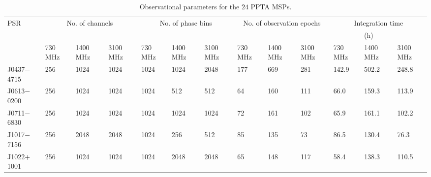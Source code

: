 \documentclass[useAMS,usenatbib]{mn2e}
\begin{document}
\begin{table}
\caption{Observational parameters for the $24$ PPTA MSPs.}
\label{obs}
\begin{center}
\begin{tabular}{p{1.5cm}p{0.9cm}<{\centering}p{0.9cm}<{\centering}p{0.9cm}<{\centering}p{0.9cm}<{\centering}p{0.9cm}<{\centering}p{0.9cm}<{\centering}p{0.9cm}<{\centering}p{0.9cm}<{\centering}p{0.9cm}<{\centering}p{0.9cm}<{\centering}p{0.9cm}<{\centering}p{0.9cm}<{\centering}}
\hline
PSR         &     \multicolumn{3}{c}{No. of channels}   &   \multicolumn{3}{c}{No. of phase bins}  &    \multicolumn{3}{c}{No. of observation epochs}   &    \multicolumn{3}{c}{Integration time}      \\
            &         &                 &          &         &             &          &         &             &          &         &   (h)            &       \\
            & 730 MHz &    1400 MHz     & 3100 MHz & 730 MHz &  1400 MHz   & 3100 MHz & 730 MHz &  1400 MHz   & 3100 MHz & 730 MHz &  1400 MHz        & 3100 MHz    \\
\hline
J0437$-$4715&  256    &    1024         &   1024   &  1024   &  1024       &  2048    &  177    &  669        & 281      &  142.9  &    502.2         &  248.8   \\
J0613$-$0200&  256    &    1024         &   1024   &  1024   &  512        &  512     &  64     &  160        & 111      &  66.0   &    159.3         &  113.9   \\
J0711$-$6830&  256    &    1024         &   1024   &  1024   &  1024       &  1024    &  72     &  161        & 102      &  65.9   &    161.1         &  102.2   \\
J1017$-$7156&  256    &    2048         &   2048   &  1024   &  256        &  512     &  85     &  135        & 73       &  86.5   &    130.4         &  76.3    \\
J1022$+$1001&  256    &    1024         &   1024   &  1024   &  2048       &  2048    &  65     &  148        & 117      &  58.4   &    138.3         &  110.5    \\

\end{tabular}
\end{center}
\end{table}
\end{document}
